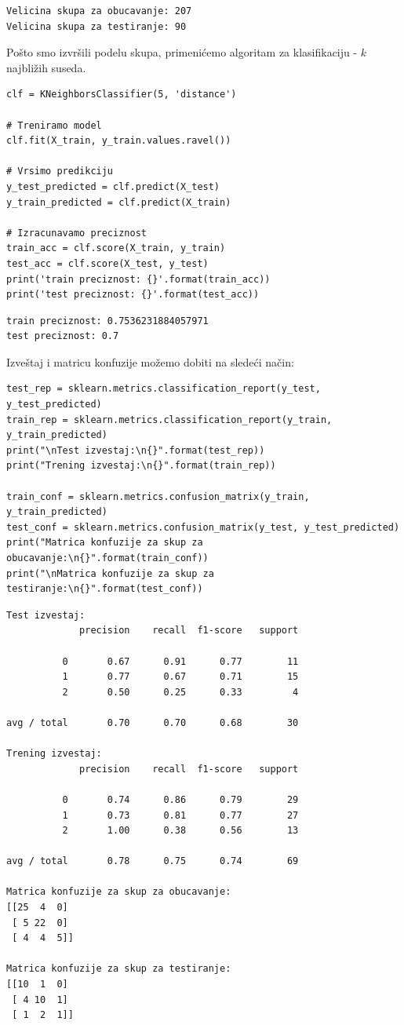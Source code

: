 \documentclass[12pt,a4paper]{article}
\begin{document}
\begin{verbatim}
Velicina skupa za obucavanje: 207
Velicina skupa za testiranje: 90
\end{verbatim}

Po\v sto smo izvr\v sili podelu skupa, primeni\' cemo algoritam za klasifikaciju - $k$ najbli\v zih suseda.

\begin{lstlisting}
clf = KNeighborsClassifier(5, 'distance')

# Treniramo model
clf.fit(X_train, y_train.values.ravel())

# Vrsimo predikciju
y_test_predicted = clf.predict(X_test)
y_train_predicted = clf.predict(X_train)

# Izracunavamo preciznost
train_acc = clf.score(X_train, y_train)
test_acc = clf.score(X_test, y_test)
print('train preciznost: {}'.format(train_acc))
print('test preciznost: {}'.format(test_acc))
\end{lstlisting}

\begin{verbatim}
train preciznost: 0.7536231884057971
test preciznost: 0.7
\end{verbatim}

Izve\v staj i matricu konfuzije mo\v zemo dobiti na slede\' ci na\v cin:

\begin{lstlisting}
test_rep = sklearn.metrics.classification_report(y_test, y_test_predicted)
train_rep = sklearn.metrics.classification_report(y_train, y_train_predicted)
print("\nTest izvestaj:\n{}".format(test_rep))
print("Trening izvestaj:\n{}".format(train_rep))

train_conf = sklearn.metrics.confusion_matrix(y_train, y_train_predicted)
test_conf = sklearn.metrics.confusion_matrix(y_test, y_test_predicted)
print("Matrica konfuzije za skup za obucavanje:\n{}".format(train_conf))
print("\nMatrica konfuzije za skup za testiranje:\n{}".format(test_conf))
\end{lstlisting}

\begin{verbatim}
Test izvestaj:
             precision    recall  f1-score   support

          0       0.67      0.91      0.77        11
          1       0.77      0.67      0.71        15
          2       0.50      0.25      0.33         4

avg / total       0.70      0.70      0.68        30

Trening izvestaj:
             precision    recall  f1-score   support

          0       0.74      0.86      0.79        29
          1       0.73      0.81      0.77        27
          2       1.00      0.38      0.56        13

avg / total       0.78      0.75      0.74        69

Matrica konfuzije za skup za obucavanje:
[[25  4  0]
 [ 5 22  0]
 [ 4  4  5]]

Matrica konfuzije za skup za testiranje:
[[10  1  0]
 [ 4 10  1]
 [ 1  2  1]]
\end{verbatim}
\end{document}
